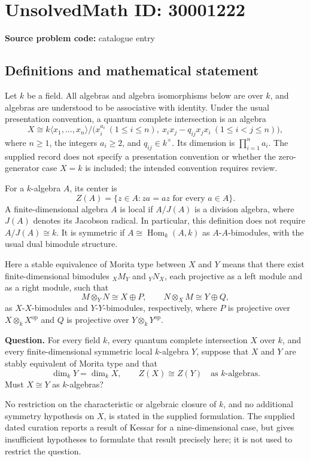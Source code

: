 \documentclass[11pt]{article}
\begin{document}
\section*{UnsolvedMath ID: 30001222}
\textbf{Source problem code:} catalogue entry
\subsection{Definitions and mathematical statement}
Let \(k\) be a field. All algebras and algebra isomorphisms below are over \(k\), and algebras are understood to be associative with identity. Under the usual presentation convention, a quantum complete intersection is an algebra
\[
X\cong k\langle x_1,\ldots,x_n\rangle\Big/\bigl(x_i^{a_i}\ (1\le i\le n),\ x_ix_j-q_{ij}x_jx_i\ (1\le i<j\le n)\bigr),
\]
where \(n\ge1\), the integers \(a_i\ge2\), and \(q_{ij}\in k^{\times}\). Its dimension is \(\prod_{i=1}^n a_i\). The supplied record does not specify a presentation convention or whether the zero-generator case \(X=k\) is included; the intended convention requires review.

For a \(k\)-algebra \(A\), its center is
\[
Z(A)=\{z\in A:za=az\text{ for every }a\in A\}.
\]
A finite-dimensional algebra \(A\) is local if \(A/J(A)\) is a division algebra, where \(J(A)\) denotes its Jacobson radical. In particular, this definition does not require \(A/J(A)\cong k\). It is symmetric if \(A\cong\operatorname{Hom}_k(A,k)\) as \(A\)-\(A\)-bimodules, with the usual dual bimodule structure.

Here a stable equivalence of Morita type between \(X\) and \(Y\) means that there exist finite-dimensional bimodules \({}_X M_Y\) and \({}_Y N_X\), each projective as a left module and as a right module, such that
\[
M\otimes_Y N\cong X\oplus P,
\qquad
N\otimes_X M\cong Y\oplus Q,
\]
as \(X\)-\(X\)-bimodules and \(Y\)-\(Y\)-bimodules, respectively, where \(P\) is projective over \(X\otimes_kX^{\mathrm{op}}\) and \(Q\) is projective over \(Y\otimes_kY^{\mathrm{op}}\).

\textbf{Question.} For every field \(k\), every quantum complete intersection \(X\) over \(k\), and every finite-dimensional symmetric local \(k\)-algebra \(Y\), suppose that \(X\) and \(Y\) are stably equivalent of Morita type and that
\[
\dim_kY=\dim_kX,
\qquad Z(X)\cong Z(Y)\quad\text{as }k\text{-algebras}.
\]
Must \(X\cong Y\) as \(k\)-algebras?

No restriction on the characteristic or algebraic closure of \(k\), and no additional symmetry hypothesis on \(X\), is stated in the supplied formulation. The supplied dated curation reports a result of Kessar for a nine-dimensional case, but gives insufficient hypotheses to formulate that result precisely here; it is not used to restrict the question.
\end{document}
